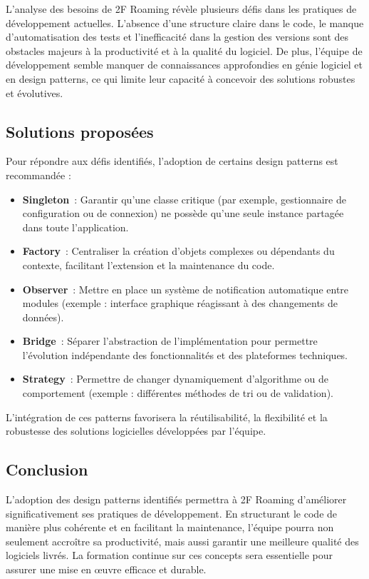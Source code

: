 L'analyse des besoins de 2F Roaming révèle plusieurs défis dans les pratiques de développement actuelles. L'absence d'une structure claire dans le code, le manque d'automatisation des tests et l'inefficacité dans la gestion des versions sont des obstacles majeurs à la productivité et à la qualité du logiciel. De plus, l'équipe de développement semble manquer de connaissances approfondies en génie logiciel et en design patterns, ce qui limite leur capacité à concevoir des solutions robustes et évolutives.

\subsection*{Solutions proposées}
{}

Pour répondre aux défis identifiés, l'adoption de certains design patterns est recommandée :

\begin{itemize}
	\item \textbf{Singleton}~: Garantir qu'une classe critique (par exemple, gestionnaire de configuration ou de connexion) ne possède qu'une seule instance partagée dans toute l'application.
	\item \textbf{Factory}~: Centraliser la création d'objets complexes ou dépendants du contexte, facilitant l'extension et la maintenance du code.
	\item \textbf{Observer}~: Mettre en place un système de notification automatique entre modules (exemple : interface graphique réagissant à des changements de données).
	\item \textbf{Bridge}~: Séparer l'abstraction de l'implémentation pour permettre l'évolution indépendante des fonctionnalités et des plateformes techniques.
	\item \textbf{Strategy}~: Permettre de changer dynamiquement d'algorithme ou de comportement (exemple : différentes méthodes de tri ou de validation).
\end{itemize}

L'intégration de ces patterns favorisera la réutilisabilité, la flexibilité et la robustesse des solutions logicielles développées par l'équipe.

\subsection*{Conclusion}
{}
L'adoption des design patterns identifiés permettra à 2F Roaming d'améliorer significativement ses pratiques de développement. En structurant le code de manière plus cohérente et en facilitant la maintenance, l'équipe pourra non seulement accroître sa productivité, mais aussi garantir une meilleure qualité des logiciels livrés. La formation continue sur ces concepts sera essentielle pour assurer une mise en œuvre efficace et durable.

